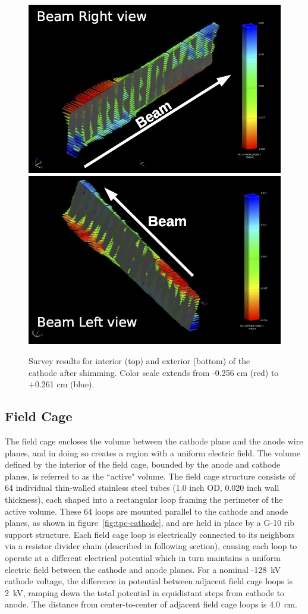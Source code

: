 \begin{figure}[htb]
\centering
\includegraphics[width=0.75\linewidth]{figures/cathode_right.jpg}
\includegraphics[width=0.75\linewidth]{figures/cathode_left.jpg}
\caption{Survey results for interior (top) and exterior (bottom) of the cathode after shimming.  Color scale extends from -0.256 cm (red) to +0.261 cm (blue).}
\label{fig:tpc-cathode-survey}
\end{figure}

\subsection{Field Cage}
The field cage encloses the volume between the cathode plane and the anode wire planes, and in doing so creates a region with a uniform electric field.  The volume defined by the interior of the field cage, bounded by the anode and cathode planes, is referred to as the ``active" volume.   The field cage structure consists of 64 individual thin-walled stainless steel tubes (1.0 inch OD, 0.020 inch wall thickness), each shaped into a rectangular loop framing the perimeter of the active volume. These 64 loops are mounted parallel to the cathode and anode planes, as shown in figure~\ref{fig:tpc-cathode}, and are held in place by a G-10 rib support structure. Each field cage loop is electrically connected to its neighbors via a resistor divider chain (described in following section), causing each loop to operate at a different electrical potential which in turn maintains a uniform electric field between the cathode and anode planes. For a nominal -128~kV cathode voltage, the difference in potential between adjacent field cage loops is 2~kV, ramping down the total potential in equidistant steps from cathode to anode. The distance from center-to-center of adjacent field cage loops is 4.0~cm.

